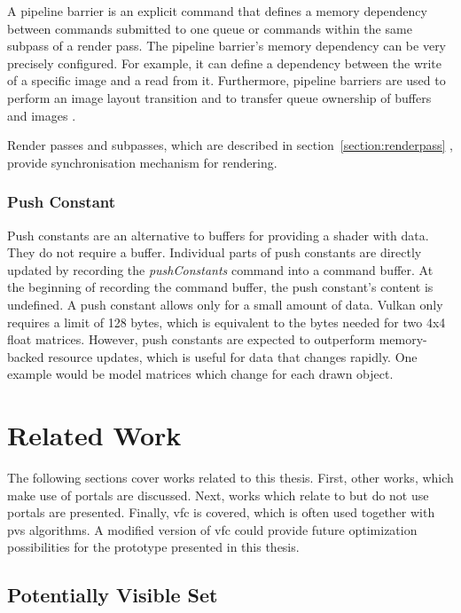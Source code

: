 A pipeline barrier is an explicit command that defines a memory dependency between commands submitted to one queue or commands within the same subpass of a render pass. The pipeline barrier's memory dependency can be very precisely configured. For example, it can define a dependency between the write of a specific image and a read from it. Furthermore, pipeline barriers are used to perform an image layout transition and to transfer queue ownership of buffers and images \cite{khronos:vulkan:spec1.1}.

Render passes and subpasses, which are described in section~\ref{section:renderpass} \cite{khronos:vulkan:spec1.1}, provide synchronisation mechanism for rendering.



\subsection{Push Constant}

Push constants are an alternative to buffers for providing a shader with data. They do not require a buffer. Individual parts of push constants are directly updated by recording the \textit{pushConstants} command into a command buffer. At the beginning of recording the command buffer, the push constant's content is undefined. A push constant allows only for a small amount of data. Vulkan only requires a limit of 128 bytes, which is equivalent to the bytes needed for two 4x4 float matrices. However, push constants are expected to outperform memory-backed resource updates, which is useful for data that changes rapidly. One example would be model matrices which change for each drawn object. 


\chapter{Related Work}
The following sections cover works related to this thesis. First, other works, which make use of portals are discussed. Next, works which relate to but do not use portals are presented. Finally, \gls{vfc} is covered, which is often used together with \gls{pvs} algorithms. A modified version of \gls{vfc} could provide future optimization possibilities for the prototype presented in this thesis.


\section{Potentially Visible Set}

